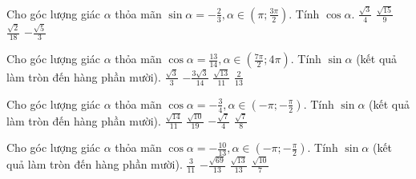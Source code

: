 \documentclass[12pt,a4paper]{article}
\begin{document}
\begin{ex}
 Cho góc lượng giác $\alpha$ thỏa mãn $\sin \alpha=- \frac{2}{3}, \alpha \in \left( \pi;\frac{3 \pi}{2} \right)$. Tính $\cos\alpha$. 
\choice
{ ${\frac{\sqrt{3}}{4}}$ }
   { ${\frac{\sqrt{15}}{9}}$ }
     { ${\frac{\sqrt{2}}{18}}$ }
    { \True ${- \frac{\sqrt{5}}{3}}$ }
\end{ex}

\begin{ex}
 Cho góc lượng giác $\alpha$ thỏa mãn $\cos \alpha=\frac{13}{14}, \alpha \in \left( \frac{7 \pi}{2}; 4\pi \right)$. Tính $\sin\alpha$ (kết quả làm tròn đến hàng phần mười). 
\choice
{ ${\frac{\sqrt{3}}{3}}$ }
   { \True ${- \frac{3 \sqrt{3}}{14}}$ }
     { ${\frac{\sqrt{13}}{11}}$ }
    { ${\frac{2}{13}}$ }
\end{ex}

\begin{ex}
 Cho góc lượng giác $\alpha$ thỏa mãn $\cos \alpha=- \frac{3}{4}, \alpha \in \left( - \pi; - \frac{\pi}{2} \right)$. Tính $\sin\alpha$ (kết quả làm tròn đến hàng phần mười). 
\choice
{ ${\frac{\sqrt{14}}{11}}$ }
   { ${\frac{\sqrt{10}}{19}}$ }
     { \True ${- \frac{\sqrt{7}}{4}}$ }
    { ${\frac{\sqrt{7}}{8}}$ }
\end{ex}

\begin{ex}
 Cho góc lượng giác $\alpha$ thỏa mãn $\cos \alpha=- \frac{10}{13}, \alpha \in \left( - \pi; - \frac{\pi}{2} \right)$. Tính $\sin\alpha$ (kết quả làm tròn đến hàng phần mười). 
\choice
{ ${\frac{3}{11}}$ }
   { \True ${- \frac{\sqrt{69}}{13}}$ }
     { ${\frac{\sqrt{13}}{13}}$ }
    { ${\frac{\sqrt{10}}{7}}$ }
\end{ex}
\end{document}
